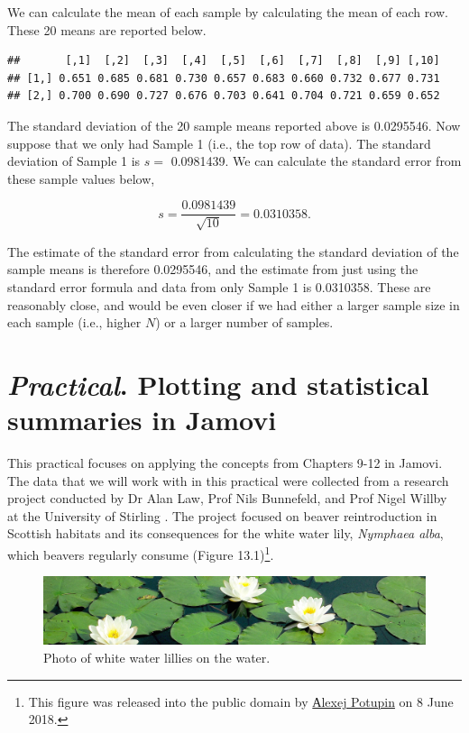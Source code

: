 \documentclass[
]{scrbook}
\begin{document}
We can calculate the mean of each sample by calculating the mean of each row.
These 20 means are reported below.

\begin{verbatim}
##       [,1]  [,2]  [,3]  [,4]  [,5]  [,6]  [,7]  [,8]  [,9] [,10]
## [1,] 0.651 0.685 0.681 0.730 0.657 0.683 0.660 0.732 0.677 0.731
## [2,] 0.700 0.690 0.727 0.676 0.703 0.641 0.704 0.721 0.659 0.652
\end{verbatim}

The standard deviation of the 20 sample means reported above is 0.0295546.
Now suppose that we only had Sample 1 (i.e., the top row of data).
The standard deviation of Sample 1 is \(s =\) 0.0981439.
We can calculate the standard error from these sample values below,

\[s = \frac{0.0981439}{\sqrt{10}} = 0.0310358.\]

The estimate of the standard error from calculating the standard deviation of the sample means is therefore 0.0295546, and the estimate from just using the standard error formula and data from only Sample 1 is 0.0310358.
These are reasonably close, and would be even closer if we had either a larger sample size in each sample (i.e., higher \(N\)) or a larger number of samples.

\hypertarget{Chapter_13}{%
\chapter{\texorpdfstring{\emph{Practical}. Plotting and statistical summaries in Jamovi}{Practical. Plotting and statistical summaries in Jamovi}}\label{Chapter_13}}

This practical focuses on applying the concepts from Chapters 9-12 in Jamovi.
The data that we will work with in this practical were collected from a research project conducted by Dr Alan Law, Prof Nils Bunnefeld, and Prof Nigel Willby at the University of Stirling \citep{Law2014}.
The project focused on beaver reintroduction in Scottish habitats and its consequences for the white water lily, \emph{Nymphaea alba}, which beavers regularly consume (Figure 13.1)\footnote{This figure was released into the public domain by \href{https://commons.wikimedia.org/wiki/File:Nymphaea_alba._Reader.jpg}{Аlexej Potupin} on 8 June 2018.}.

\begin{figure}
\includegraphics[width=1\linewidth]{img/Nymphaea_alba_pads} \caption{Photo of white water lillies on the water.}\label{fig:unnamed-chunk-46}
\end{figure}
\end{document}
